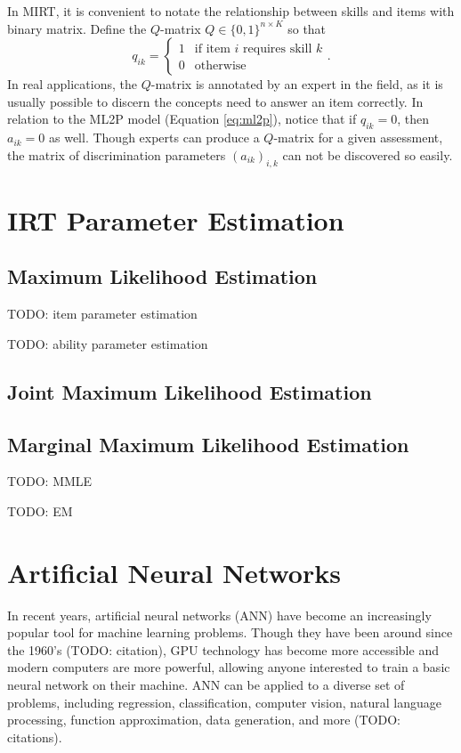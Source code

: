 In MIRT, it is convenient to notate the relationship between skills and items with binary matrix. Define the $Q$-matrix \cite{daSilva2018} $Q \in \{0,1\}^{n\times K}$ so that 
\begin{equation}
  q_{ik} = \begin{cases}
    1 & \text{if item } i \text{ requires skill } k\\
    0 & \text{otherwise}
  \end{cases}.
  \label{eq:q_matrix}
\end{equation}
In real applications, the $Q$-matrix is annotated by an expert in the field, as it is usually possible to discern the concepts need to answer an item correctly. In relation to the ML2P model (Equation \ref{eq:ml2p}), notice that if $q_{ik} = 0$, then $a_{ik} = 0$ as well. Though experts can produce a $Q$-matrix for a given assessment, the matrix of discrimination parameters $(a_{ik})_{i,k}$ can not be discovered so easily.

\section{IRT Parameter Estimation}

\subsection{Maximum Likelihood Estimation}
TODO: item parameter estimation

TODO: ability parameter estimation

\subsection{Joint Maximum Likelihood Estimation}


\subsection{Marginal Maximum Likelihood Estimation}
TODO: MMLE

TODO: EM 

\section{Artificial Neural Networks}
In recent years, artificial neural networks (ANN) have become an increasingly popular tool for machine learning problems. Though they have been around since the 1960's (TODO: citation), GPU technology has become more accessible and modern computers are more powerful, allowing anyone interested to train a basic neural network on their machine. ANN can be applied to a diverse set of problems, including regression, classification, computer vision, natural language processing, function approximation, data generation, and more (TODO: citations).

